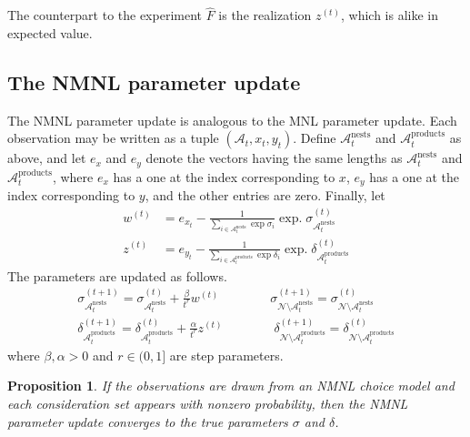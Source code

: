 \documentclass[preprint,12pt,authoryear]{elsarticle}
\DeclareMathOperator*{\expd}{exp.}
\newtheorem{proposition}{Proposition}
\begin{document}
The counterpart to the experiment $\hat F$ is the realization $z^{(t)}$, which is alike in expected value.


\subsection{The NMNL parameter update}
The NMNL parameter update is analogous to the MNL parameter update. Each observation may be written as a tuple $(\mathcal{A}_t, x_t, y_t)$. Define $\mathcal{A}_t^{\text{nests}}$ and $\mathcal{A}_{t}^{\text{products}}$ as above, and let $e_x$ and $e_y$ denote the vectors having the same lengths as $\mathcal{A}_t^{\text{nests}}$ and $\mathcal{A}_{t}^{\text{products}}$, where $e_x$ has a one at the index corresponding to $x$, $e_y$ has a one at the index corresponding to $y$, and the other entries are zero. Finally, let
\begin{align}
w^{(t)} &= e_{x_t} -  \frac{1}{\sum_{i\in \mathcal{A}_{t}^{\text{nests}}} \exp \sigma_i} \expd \sigma^{(t)}_{\mathcal{A}_{t}^{\text{nests}}} \\
z^{(t)} &= e_{y_t} -  \frac{1}{\sum_{i\in \mathcal{A}_{t}^{\text{products}}} \exp \delta_i} \expd \delta^{(t)}_{\mathcal{A}_{t}^{\text{products}}}
\end{align}
The parameters are updated as follows.
\begin{align}\label{nmnlparameterupdate}
\sigma^{(t+1)}_{\mathcal{A}_t^{\text{nests}}} = \sigma^{(t)}_{\mathcal{A}_t^{\text{nests}}} + \frac{\beta}{t^r} w^{(t)} \qquad\qquad
\sigma^{(t+1)}_{\mathcal{N} \setminus \mathcal{A}_t^{\text{nests}}} = \sigma^{(t)}_{\mathcal{N} \setminus \mathcal{A}_t^{\text{nests}}} \\
\delta^{(t+1)}_{\mathcal{A}_t^{\text{products}}} = \delta^{(t)}_{\mathcal{A}_t^{\text{products}}} + \frac{\alpha}{t^r} z^{(t)} \qquad\qquad
\delta^{(t+1)}_{\mathcal{N} \setminus \mathcal{A}_t^{\text{products}}} = \delta^{(t)}_{\mathcal{N} \setminus \mathcal{A}_t^{\text{products}}}
\end{align}
where $\beta, \alpha >0$ and $r \in (0, 1]$ are step parameters.

\begin{proposition}If the observations are drawn from an NMNL choice model and each consideration set appears with nonzero probability, then the NMNL parameter update converges to the true parameters $\sigma$ and $\delta$.\end{proposition}
\end{document}
